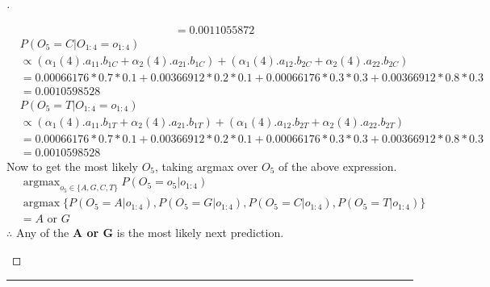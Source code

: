 \documentclass[a4paper, 12pt]{article}
\DeclareMathOperator*{\argmax}{argmax}
\begin{document}
\begin{proof}[]
\begin{enumerate}[label={\color{blue}{\textbf{3.\arabic*})}}]
\begin{align*}
        &= 0.0011055872
    \end{align*}
    \begin{align*}
        &P(O_5=C | O_{1:4}=o_{1:4})\\
        &\propto (\alpha_1(4).a_{11}.b_{1C} + \alpha_2(4).a_{21}.b_{1C}) + (\alpha_1(4).a_{12}.b_{2C} + \alpha_2(4).a_{22}.b_{2C})\\
        &= 0.00066176*0.7*0.1 + 0.00366912*0.2*0.1 + 0.00066176*0.3*0.3 + 0.00366912*0.8*0.3\\
        &= 0.0010598528
    \end{align*}
    \begin{align*}
        &P(O_5=T | O_{1:4}=o_{1:4})\\
        &\propto (\alpha_1(4).a_{11}.b_{1T} + \alpha_2(4).a_{21}.b_{1T}) + (\alpha_1(4).a_{12}.b_{2T} + \alpha_2(4).a_{22}.b_{2T})\\
        &= 0.00066176*0.7*0.1 + 0.00366912*0.2*0.1 + 0.00066176*0.3*0.3 + 0.00366912*0.8*0.3\\
        &= 0.0010598528
    \end{align*}
    Now to get the most likely $O_5$, taking argmax over $O_5$ of the above expression.
    \begin{align*}
            &\argmax_{o_5 \in \{A, G, C, T\}}P(O_5=o_5 | o_{1:4})\\
            &\argmax\{P(O_5=A | o_{1:4}), P(O_5=G | o_{1:4}), P(O_5=C | o_{1:4}), P(O_5=T | o_{1:4})\}\\
            &= A \text{ or } G \tag*{(Using the above values)}
    \end{align*}
    $\therefore$ Any of the \textbf{A or G} is the most likely next prediction.
\end{enumerate}

\end{proof}
\hrule
\bigskip
\end{document}

